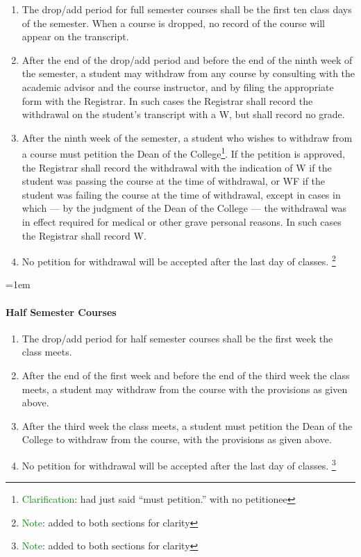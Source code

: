 \documentclass{manual}
\newcommand{\modified}[1]{}
\newcommand{\oldbreak}[1]{}
\let\oldparagraph\paragraph
\renewcommand\paragraph{\leftskip=1em\oldparagraph}
\newcommand{\editRemark}[3]{\textcolor{green}{#2}\footnote{\textcolor{green}{#1}: #3}}
\newcommand{\editNote}[1]{\editRemark{Note}{}{#1}}
\newcommand{\itemLevelA}{\alph*.}
\newcommand{\itemRefA}{\alph*}
\begin{document}
\begin{enumerate}[label=\itemLevelA,ref=\itemRefA]
\item The drop/add period for full semester courses shall be the first ten class days of the semester. When a course is dropped, no record of the course will appear on the transcript.\modified{2/08/11}

\item After the end of the drop/add period and before the end of the ninth \modified{2/08/11} week of the semester, a student may withdraw from any course by consulting with the academic advisor and the course instructor, and by filing the appropriate form with the Registrar. In such cases the Registrar shall record the withdrawal on the student's transcript with a W, but shall record no grade.

\oldbreak{V-5}

\item After the ninth week of the semester, a student who wishes to withdraw from a course\modified{2/03/11} must petition the Dean of the College\editRemark{Clarification}{}{had just said ``must petition.'' with no petitionee}. If the petition is approved, the Registrar shall record the withdrawal with the indication of W if the student was passing the course at the time of withdrawal, or WF if the student was failing the course at the time of withdrawal, except in cases in which --- by the judgment of the Dean of the College --- the withdrawal was in effect required for medical or other grave personal reasons. In such cases the Registrar shall record W.

\item No petition for withdrawal will be accepted after the last day of classes. \editNote{added to both sections for clarity}

\end{enumerate}

\paragraph{Half Semester Courses} \modified{5/13/93}

\begin{enumerate}[label=\itemLevelA,ref=\itemRefA]
\item The drop/add period for half semester courses shall be the first week the class meets.

\item After the end of the first week and before the end of the third week the class meets, a student may withdraw from the course with the provisions as given above.

\item  After the third week the class meets, a student must petition the Dean of the College to withdraw from the course, with the provisions as given above.

\item No petition for withdrawal will be accepted after the last day of classes. \editNote{added to both sections for clarity}
\end{enumerate}
\end{document}
